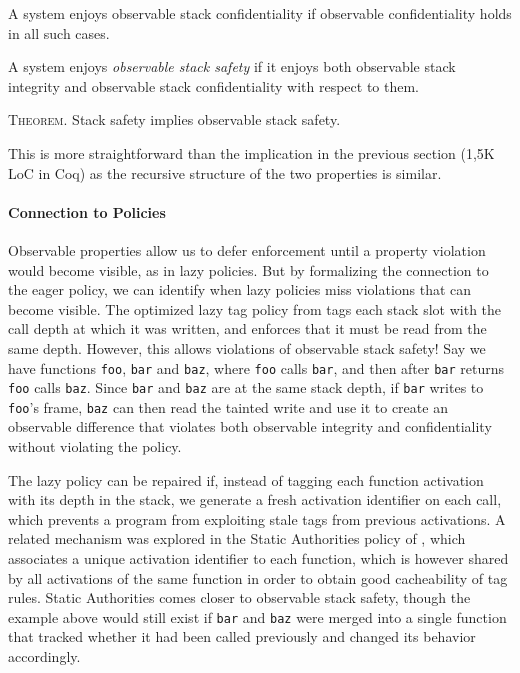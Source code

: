 \documentclass[acmsmall,review,anonymous]{acmart}\settopmatter{printfolios=true,printccs=false,printacmref=false}
\begin{document}
{{      A system enjoys observable stack confidentiality if observable
      confidentiality holds in all such cases.

    A system enjoys {\em observable stack safety}
    if it enjoys both observable stack integrity and
      observable stack confidentiality with respect to them.

      \medskip
      \textsc{Theorem.}
      Stack safety implies observable stack safety.
      \smallskip

      This is more straightforward than the implication in the previous
      section (1,5K LoC in Coq) as the recursive
      structure of the two properties is similar.

    \paragraph{Connection to Policies}

    Observable properties allow us to defer enforcement until a property
    violation would become visible, as in lazy policies. But by formalizing
    the connection to the eager policy, we can identify when lazy policies
    miss violations that can become visible. The optimized lazy tag policy from
    \citet{DBLP:conf/sp/RoesslerD18} tags each stack slot with the call depth
    at which it was written, and enforces that it must be read from the
    same depth. However, this allows violations of observable stack safety!
    Say we have functions {\tt foo}, {\tt bar} and {\tt baz}, where {\tt foo}
    calls {\tt bar}, and then after {\tt bar} returns {\tt foo} calls
    {\tt baz}. Since {\tt bar} and {\tt baz} are at the same stack depth, if
    {\tt bar} writes to {\tt foo}'s frame, {\tt baz} can then read the tainted
    write and use it to create an observable difference that violates both
    observable integrity and confidentiality without violating the policy.

    The lazy policy can be repaired if, instead of tagging each function
    activation with its depth in the stack, we generate a fresh activation
    identifier on each call, which prevents a program from exploiting stale
    tags from previous activations. A related mechanism was explored in the
    Static Authorities policy of \citet{DBLP:conf/sp/RoesslerD18}, which
    associates a unique activation identifier to each function, which is
    however shared by all activations of the same function in order to obtain
    good cacheability of tag rules. Static Authorities comes closer to
    observable stack safety, though the example above would still exist
    if {\tt bar} and {\tt baz} were merged into a single function that tracked
    whether it had been called previously and changed its behavior accordingly.
    \ifaftersubmission{}\fi

}}
\end{document}
